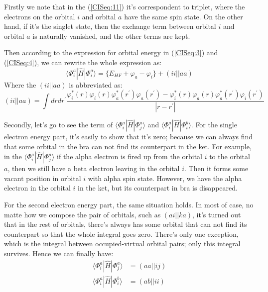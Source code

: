 Firstly we note that in the (\ref{CISeq:11}) it's correspondent to
triplet, where the electrons on the orbital $i$ and orbital $a$ have
the same spin state. On the other hand, if it's the singlet state,
then the exchange term between orbital $i$ and orbital $a$ is
naturally vanished, and the other terms are kept.

Then according to the expression for orbital energy in (\ref{CISeq:3})
and (\ref{CISeq:4}), we can rewrite the whole expression as:
\begin{equation}
  \label{CISeq:12}
    \langle\Phi_{i}^{a}|\hat{H}|\Phi_{i}^{a}\rangle = \Big\{ E_{HF} +
    \varphi_{a} - \varphi_{i}\Big\} + (ii||aa)
\end{equation}
Where the $(ii||aa)$ is abbreviated as:
\begin{equation}
  (ii||aa) = \int dr d r^{'}
  \frac{\varphi_{i}^{*}(r)\varphi_{i}(r)\varphi_{a}^{*}(r^{'})\varphi_{a}(r^{'})
   - \varphi_{i}^{*}(r)\varphi_{a}(r)\varphi_{a}^{*}(r^{'})\varphi_{i}(r^{'})}
  {|r-r^{'}|}
\end{equation}

Secondly, let's go to see the term of
$\langle\Phi_{i}^{a}|\hat{H}|\Phi_{j}^{a}\rangle$ and
$\langle\Phi_{i}^{a}|\hat{H}|\Phi_{i}^{b}\rangle$. For the single
electron energy part, it's easily to show that it's zero; because we
can always find that some orbital in the bra can not find its
counterpart in the ket. For example, in the
$\langle\Phi_{i}^{a}|\hat{H}|\Phi_{j}^{a}\rangle$ if the alpha
electron is fired up from the orbital $i$ to the orbital $a$, then we
still have a beta electron leaving in the orbital $i$. Then it forms
some vacant position in orbital $i$ with alpha spin state. However, we
have the alpha electron in the orbital $i$ in the ket, but its
counterpart in bra is disappeared. 

For the second electron energy part, the same situation holds. In most
of case, no matte how we compose the pair of orbitals, such as
$(ai||ka)$, it's turned out that in the rest of orbitals, there's
always has some orbital that can not find its counterpart so that the
whole integral goes zero. There's only one exception, which is the
integral between occupied-virtual orbital pairs; only this integral
survives. Hence we can finally have:
\begin{align}
  \label{CISeq:13}
  \langle\Phi_{i}^{a}|\hat{H}|\Phi_{j}^{a}\rangle &= (aa||ij)
  \nonumber \\
  \langle\Phi_{i}^{a}|\hat{H}|\Phi_{i}^{b}\rangle &= (ab||ii) 
\end{align}
 
